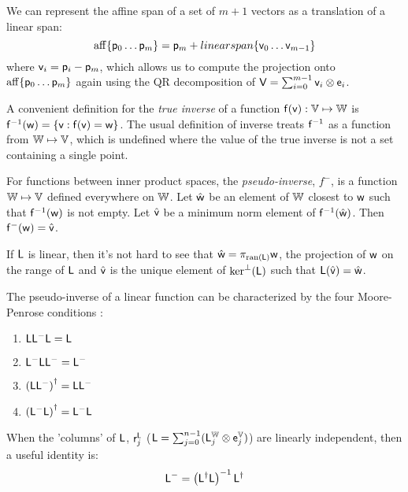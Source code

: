 We can represent the affine span of a set of $m+1$ vectors
as a translation of a linear span:
\begin{equation}
\mathrm{aff}\{ \mathsf{p}_0 \ldots \mathsf{p}_{m} \} = \mathsf{p}_m + \\linearspan\{\mathsf{v}_0 \ldots \mathsf{v}_{m-1}\}
\end{equation}
where $\mathsf{v}_i = \mathsf{p}_i - \mathsf{p}_m$,
which allows us to compute the projection onto
$\mathrm{aff}\{ \mathsf{p}_0 \ldots \mathsf{p}_{m} \}$
again using the QR decomposition
of $\mathsf{V} = \sum_{i=0}^{m-1} \mathsf{v}_i \otimes \mathsf{e}_i$.

\label{sec:Inverses-and-pseudo-inverses}

A convenient definition for the \textit{true inverse}
of a function $\mathsf{f}(\mathsf{v}):\mathbb{V} \mapsto \mathbb{W}$ is
$\mathsf{f}^{-1}(\mathsf{w}) = \{ \mathsf{v} : \mathsf{f}(\mathsf{v}) = \mathsf{w} \}$.
The usual definition of inverse treats $\mathsf{f}^{-1}$
as a function from $\mathbb{W} \mapsto \mathbb{V}$,
which is undefined where the value of the true
inverse is not a set containing a single point.

For functions between inner product spaces,
the \textit{pseudo-inverse}, $f^{-}$, is a function $\mathbb{W} \mapsto \mathbb{V}$
defined everywhere on $\mathbb{W}$.
Let $\hat{\mathsf{w}}$ be an element of $\mathbb{W}$ closest to $\mathsf{w}$
such that $\mathsf{f}^{-1}(\mathsf{w})$ is not empty.
Let $\hat{\mathsf{v}}$ be a minimum norm element of $\mathsf{f}^{-1}(\hat{\mathsf{w}})$.
Then $\mathsf{f}^{-}(\mathsf{w}) = \hat{\mathsf{v}}$.

If $\mathsf{L}$ is linear, then it's not hard to see that
$\hat{\mathsf{w}} = \pi_{\mathrm{ran}(\mathsf{L})} \mathsf{w}$, the projection of $\mathsf{w}$
on the range of $\mathsf{L}$
and
$\hat{\mathsf{v}}$ is the unique element of $\mathrm{ker}^{\perp}(\mathsf{L})$
such that $\mathsf{L}(\hat{\mathsf{v}}) = \hat{\mathsf{w}}$.

The pseudo-inverse of a linear function can be characterized
by the four Moore-Penrose conditions
\cite[See][sec. 5.5.2]{golub-vanloan-2012}:
\begin{enumerate}
\item $\mathsf{L} \mathsf{L}^{-} \mathsf{L} = \mathsf{L}$
\item $\mathsf{L}^{-} \mathsf{L} \mathsf{L}^{-} = \mathsf{L}^{-}$
\item $\left( \mathsf{L} \mathsf{L}^{-} \right)^{\dagger} = \mathsf{L} \mathsf{L}^{-}$
\item $\left( \mathsf{L}^{-} \mathsf{L} \right)^{\dagger} = \mathsf{L}^{-} \mathsf{L}$
\end{enumerate}

When the 'columns' of $\mathsf{L}$, $\mathsf{r}_j^{\mathsf{L}}$
($\mathsf{L} = \sum_{j=0}^{n-1} ( \mathsf{L}_j^{\mathbb{W}} \otimes \mathsf{e}_j^{\mathbb{V}} )$)
are linearly independent,
then a useful identity is:
\begin{equation}
\label{eq:full-rank-pseudo-inverse}
\mathsf{L}^{-} = \left( \mathsf{L}^{\dagger} \mathsf{L} \right)^{-1} \mathsf{L}^{\dagger}
\end{equation}

